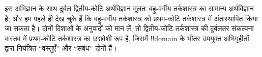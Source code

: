 \documentclass[../../../include/open-logic-section]{subfiles}
\begin{document}
इस अभिज्ञान के साथ दुर्बल द्वितीय-कोटि अर्थविज्ञान मूलतः बहु-वर्गीय
तर्कशास्त्र का सामान्य अर्थविज्ञान है; और हम पहले ही देख चुके हैं कि
बहु-वर्गीय तर्कशास्त्र को प्रथम-कोटि तर्कशास्त्र में अंतःस्थापित किया जा
सकता है। दोनों दिशाओं के अनुवादों को मान लें, तो द्वितीय-कोटि तर्कशास्त्र की
दुर्बलतर संकल्पना वास्तव में प्रथम-कोटि तर्कशास्त्र का छद्मवेशी रूप है,
जिसमें !!{domain} के भीतर उपयुक्त अभिगृहीतों द्वारा नियंत्रित ``वस्तुएँ'' और
``संबंध'' दोनों हैं।
\end{document}
